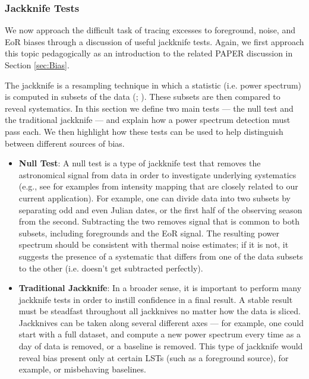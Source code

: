 \documentclass[preprint2,numberedappendix,tighten]{aastex6}
\begin{document}
\subsubsection{Jackknife Tests}
\label{sec:JackknifeOverview}

We now approach the difficult task of tracing excesses to foreground, noise, and EoR biases through a discussion of useful 
jackknife tests. Again, we first approach this topic pedagogically as an introduction to the related PAPER discussion in Section 
\ref{sec:Bias}. 

The jackknife is a resampling technique in which a statistic (i.e. power spectrum) is computed in subsets of the data (\citealt{quenouille1949}; \citealt{tukey1958}). These 
subsets are then compared to reveal systematics. In this section we define two main tests --- the null test and the traditional 
jackknife --- and explain how a power spectrum detection must pass each. We then highlight how these tests can be used to 
help distinguish between different sources of bias.
 
\begin{itemize}
\item \textbf{Null Test}: A null test is a type of jackknife test that removes the astronomical signal from data in order to 
investigate underlying systematics (e.g., see \citet{keating_et_al2016} for examples from intensity mapping that are closely related to our current application). For example, one can 
divide data into two subsets by separating odd and even Julian dates, or the first half of the observing season from the second. 
Subtracting the two removes signal that is common to both subsets, including foregrounds and the EoR signal. The resulting power 
spectrum should be consistent with thermal noise estimates; if it is not, it suggests the presence of a systematic that differs 
from one of the data subsets to the other (i.e. doesn't get subtracted perfectly). 
\item \textbf{Traditional Jackknife}: In a broader sense, it is important to perform many jackknife tests in order to instill 
confidence in a final result. A stable result must be steadfast throughout all jackknives no matter how the data is sliced. 
Jackknives can be taken along several different axes --- for example, one could start with a full dataset, and compute a new 
power spectrum every time as a day of data is removed, or a baseline is removed. This type of jackknife would reveal bias 
present only at certain LSTs (such as a foreground source), for example, or misbehaving baselines.
\end{itemize}
\end{document}
